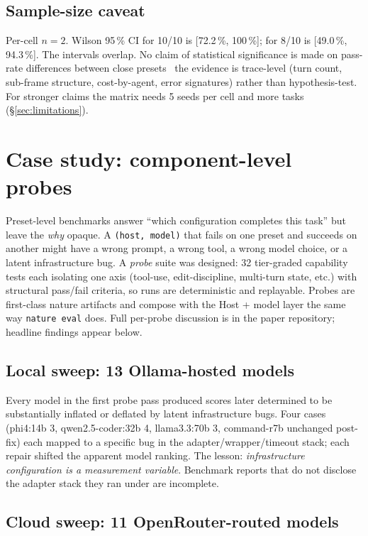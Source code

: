 \documentclass[11pt,a4paper]{article}
\begin{document}
\subsection{Sample-size caveat}

Per-cell $n=2$. Wilson 95\,\% CI for 10/10 is [72.2\,\%, 100\,\%];
for 8/10 is [49.0\,\%, 94.3\,\%]. The intervals overlap. No
claim of statistical significance is made on pass-rate
differences between close presets \textemdash\ the evidence is
trace-level (turn count, sub-frame structure, cost-by-agent,
error signatures) rather than hypothesis-test. For stronger claims the
matrix needs 5 seeds per cell and more tasks
(\S\ref{sec:limitations}).

\section{Case study: component-level probes}
\label{sec:probes}

Preset-level benchmarks answer ``which configuration completes
this task'' but leave the \emph{why} opaque. A
\texttt{(host, model)} that fails on one preset and succeeds on
another might have a wrong prompt, a wrong tool, a wrong model
choice, or a latent infrastructure bug. A \emph{probe} suite was
designed: 32 tier-graded capability tests each
isolating one axis (tool-use, edit-discipline, multi-turn state,
etc.) with structural pass/fail criteria, so runs are
deterministic and replayable. Probes are first-class nature
artifacts and compose with the Host + model layer the same way
\texttt{nature eval} does. Full per-probe discussion is in the
paper repository; headline findings appear below.

\subsection{Local sweep: 13 Ollama-hosted models}

Every model in the first probe pass produced scores later
determined to be substantially inflated or deflated by latent
infrastructure bugs. Four cases (phi4:14b 3,
qwen2.5-coder:32b 4, llama3.3:70b 3,
command-r7b unchanged post-fix) each mapped to a specific bug in
the adapter/wrapper/timeout stack; each repair shifted the
apparent model ranking. The lesson: \emph{infrastructure
configuration is a measurement variable}. Benchmark reports that
do not disclose the adapter stack they ran under are incomplete.

\subsection{Cloud sweep: 11 OpenRouter-routed models}
\end{document}
